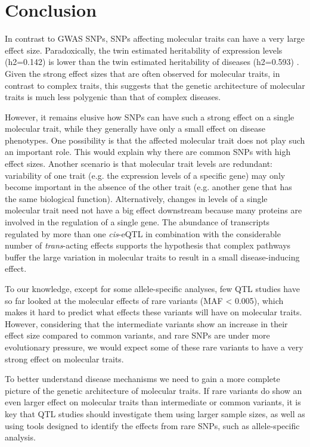\section{Conclusion}
In contrast to GWAS SNPs, SNPs affecting molecular traits can have a very large effect size. Paradoxically, the twin estimated heritability of expression levels (h2=0.142) \cite{wrightHeritabilityGenomicsGene2014} is lower than the twin estimated heritability of diseases (h2=0.593) \cite{poldermanMetaanalysisHeritabilityHuman2015}. Given the strong effect sizes that are often observed for molecular traits, in contrast to complex traits, this suggests that the genetic architecture of molecular traits is much less polygenic than that of complex diseases. 

However, it remains elusive how SNPs can have such a strong effect on a single molecular trait, while they generally have only a small effect on disease phenotypes. One possibility is that the affected molecular trait does not play such an important role. This would explain why there are common SNPs with high effect sizes. Another scenario is that molecular trait levels are redundant: variability of one trait (e.g. the expression levels of a specific gene) may only become important in the absence of the other trait (e.g. another gene that has the same biological function). Alternatively, changes in levels of a single molecular trait need not have a big effect downstream because many proteins are involved in the regulation of a single gene. The abundance of transcripts regulated by more than one \emph{cis}-eQTL in combination with the considerable number of \emph{trans}-acting effects supports the hypothesis that complex pathways buffer the large variation in molecular traits to result in a small disease-inducing effect.

To our knowledge, except for some allele-specific analyses, few QTL studies have so far looked at the molecular effects of rare variants (MAF < 0.005), which makes it hard to predict what effects these variants will have on molecular traits. However, considering that the intermediate variants show an increase in their effect size compared to common variants, and rare SNPs are under more evolutionary pressure, we would expect some of these rare variants to have a very strong effect on molecular traits.

To better understand disease mechanisms we need to gain a more complete picture of the genetic architecture of molecular traits. If rare variants do show an even larger effect on molecular traits than intermediate or common variants, it is key that QTL studies should investigate them using larger sample sizes, as well as using tools designed to identify the effects from rare SNPs, such as allele-specific analysis. 


